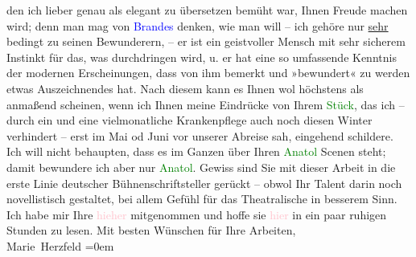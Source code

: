                den ich lieber genau als elegant zu übersetzen bemüht war, Ihnen Freude machen wird;
               denn man mag von \textcolor{blue}{Brandes}{}\ledrightnote{\textcolor{blue}{Georg Brandes}} denken, wie man will –
               ich gehöre nur \uline{sehr} bedingt zu seinen Bewunderern, –
               er ist ein geistvoller Mensch mit sehr sicherem Instinkt für das, was durchdringen
               wird, u. er hat eine so umfassende Kenntnis der modernen Erscheinungen, dass von ihm
                  be{\pb}merkt und »bewundert« zu werden etwas Auszeichnendes
               hat. Nach diesem kann es Ihnen wol höchstens als anmaßend scheinen, wenn ich Ihnen
               meine Eindrücke von Ihrem \textcolor{green}{Stück}{},
               das ich – durch ein \label{K_L02590-3v}\label{K_L02590-3h} und eine vielmonatliche Krankenpflege auch noch diesen Winter
               verhindert – erst im Mai{ }\introOben{}od Juni\introOben{} vor unserer Abreise sah, eingehend schildere.\pend
           \pstart
           Ich will nicht behaupten, dass es im Ganzen über Ihren \textcolor{green}{Anatol}{}\ledrightnote{\textcolor{green}{Anatol}} Scenen steht; damit bewundere ich aber nur \textcolor{green}{Anatol}{}\ledrightnote{\textcolor{green}{Anatol}}. Gewiss sind Sie mit dieser Arbeit in {\pb}die erste Linie deutscher Bühnenschriftsteller gerückt –
               obwol Ihr Talent darin noch novellistisch 
               gestaltet, bei allem Gefühl für das Theatralische in besserem Sinn. Ich habe mir Ihre
                  \label{K_L02590-4v}\label{K_L02590-4h}{ }\textcolor{pink}{hieher}{}
               mitgenommen und hoffe sie \textcolor{pink}{hier}{}
               in ein paar ruhigen Stunden zu lesen.\pend
           \pstart
           Mit besten Wünschen für Ihre Arbeiten, {\\[\baselineskip]}\spacefill\mbox{Marie
               Herzfeld}\pend
           \leftskip=0em{}\endnumbering{}  
      
